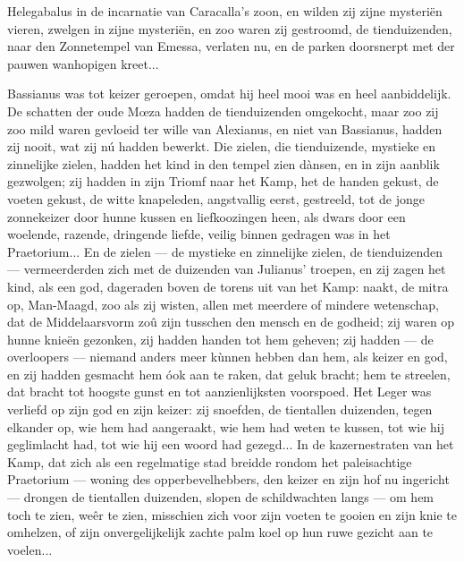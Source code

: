 \documentclass[a4paper, 12pt, oneside, dutch]{article}
\begin{document}
Helegabalus in de incarnatie van Caracalla's zoon, en wilden zij zijne mysteriën vieren, zwelgen in zijne mysteriën, en zoo waren zij gestroomd, de tienduizenden, naar den Zonnetempel van Emessa, verlaten nu, en de parken doorsnerpt met der pauwen wanhopigen kreet...

Bassianus was tot keizer geroepen, omdat hij heel mooi was en heel aanbiddelijk. De schatten der oude Mœza hadden de tienduizenden omgekocht, maar zoo zij zoo mild waren gevloeid ter wille van Alexianus, en niet van Bassianus, hadden zij nooit, wat zij nú hadden bewerkt. Die zielen, die tienduizende, mystieke en zinnelijke zielen, hadden het kind in den tempel zien dànsen, en in zijn aanblik gezwolgen; zij hadden in zijn Triomf naar het Kamp, het de handen gekust, de voeten gekust, de witte knapeleden, angstvallig eerst, gestreeld, tot de jonge zonnekeizer door hunne kussen en liefkoozingen heen, als dwars door een woelende, razende, dringende liefde, veilig binnen gedragen was in het Praetorium... En de zielen --- de mystieke en zinnelijke zielen, de tienduizenden --- vermeerderden zich met de duizenden van Julianus' troepen, en zij zagen het kind, als een god, dageraden boven de torens uit van het Kamp: naakt, de mitra op, Man-Maagd, zoo als zij wisten, allen met meerdere of mindere wetenschap, dat de Middelaarsvorm zoû zijn tusschen den mensch en de godheid; zij waren op hunne knieën gezonken, zij hadden handen tot hem geheven; zij hadden --- de overloopers --- niemand anders meer kùnnen hebben dan hem, als keizer en god, en zij hadden gesmacht hem óok aan te raken, dat geluk bracht; hem te streelen, dat bracht tot hoogste gunst en tot aanzienlijksten voorspoed. Het Leger was verliefd op zijn god en zijn keizer: zij snoefden, de tientallen duizenden, tegen elkander op, wie hem had aangeraakt, wie hem had weten te kussen, tot wie hij geglimlacht had, tot wie hij een woord had gezegd... In de kazernestraten van het Kamp, dat zich als een regelmatige stad breidde rondom het paleisachtige Praetorium --- woning des opperbevelhebbers, den keizer en zijn hof nu ingericht --- drongen de tientallen duizenden, slopen de schildwachten langs --- om hem toch te zien, weêr te zien, misschien zich voor zijn voeten te gooien en zijn knie te omhelzen, of zijn onvergelijkelijk zachte palm koel op hun ruwe gezicht aan te voelen...
\end{document}
